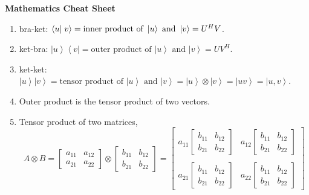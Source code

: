 \documentclass[10pt,a4paper]{article}
\newcommand{\bra}[1]{\ensuremath{\left\langle#1\right|}}
\newcommand{\ket}[1]{\ensuremath{\left|#1\right\rangle}}
\newcommand{\braket}[2]{\ensuremath{\left\langle#1 \vphantom{#2}\right| \left. #2 \vphantom{#1}\right\rangle}}
\begin{document}
\begin{center}
\textbf{\Huge Mathematics Cheat Sheet} 
\vspace{.2in}
\end{center}

\begin{enumerate}
  \item bra-ket: $\braket{u}{v} = \textrm{inner product of } \ket{u} \textrm{ and } \ket{v} = U^H V$.
  \item ket-bra: $\ket{u}\bra{v} = \textrm{outer product of } \ket{u} \textrm{ and } \ket{v} = U V^H$.
  \item ket-ket: $\ket{u}\ket{v} = \textrm{tensor product of } \ket{u} \textrm{ and } \ket{v} = \ket{u} \otimes \ket{v} = \ket{uv} = \ket{u, v}$.
  \item Outer product is the tensor product of two vectors.
  \item Tensor product of two matrices, 
    \begin{equation}
      A \otimes B
      = 
      \begin{bmatrix}
        a_{11} &a_{12} \\
        a_{21} &a_{22}
      \end{bmatrix}
      \otimes 
      \begin{bmatrix}
        b_{11} &b_{12} \\
        b_{21} &b_{22}
      \end{bmatrix}
      = 
      \begin{bmatrix}
        a_{11}
        \begin{bmatrix} 
          b_{11} &b_{12} \\
          b_{21} &b_{22}
        \end{bmatrix}
        &a_{12} 
        \begin{bmatrix} 
          b_{11} &b_{12} \\
          b_{21} &b_{22}
        \end{bmatrix}
        \\
        \\
        a_{21} 
        \begin{bmatrix} 
          b_{11} &b_{12} \\
          b_{21} &b_{22}
        \end{bmatrix}
        &a_{22}
        \begin{bmatrix} 
          b_{11} &b_{12} \\
          b_{21} &b_{22}
        \end{bmatrix}
      \end{bmatrix}
    \end{equation}
\end{enumerate}
\end{document}
